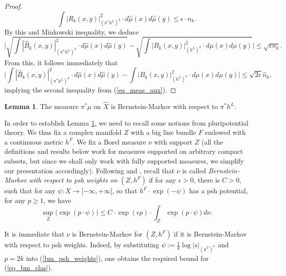\documentclass[12pt]{article}
\numberwithin{equation}{section}
\theoremstyle{theorem}
\theoremstyle{definition}
\newtheorem{lem}[thm]{Lemma}
\theoremstyle{remark}
\begin{document}
\begin{proof}
\begin{equation}
			\int |R_k(x, y)|^2_{(\pi^* h^L)^k} \cdot d \hat{\mu}(x) d \hat{\mu}(y)
			\leq
			\epsilon \cdot n_k.
		\end{equation}
		By this and Minkowski inequality, we deduce 
		\begin{equation}
			\bigg|
			\sqrt{ \int |\hat{B}_k(x, y)|^2_{(\pi^* h^L)^k} \cdot d \hat{\mu}(x) d \hat{\mu}(y)} 
			- 
			\sqrt{ \int |B_k(x, y)|^2_{(h^L)^k} \cdot d \mu(x) d \mu(y)}
			\bigg|
			\leq
			\sqrt{\epsilon n_k}.
		\end{equation}
		From this, it follows immediately that
		\begin{equation}
			\Big|
			\int |\hat{B}_k(x, y)|^2_{(\pi^* h^L)^k} \cdot d \hat{\mu}(x) d \hat{\mu}(y)
			- 
			\int |B_k(x, y)|^2_{(h^L)^k} \cdot d \mu(x) d \mu(y)
			\Big|
			\leq
			\sqrt{2 \epsilon} \hat{n}_k,
		\end{equation}
		implying the second inequality from (\ref{eq_meas_aux}).
	\end{proof}
	\begin{lem}\label{lem_bm}
		The measure $\pi^* \mu$ on $\hat{X}$ is Bernstein-Markov with respect to $\pi^* h^L$.
	\end{lem}
	In order to establish Lemma \ref{lem_bm}, we need to recall some notions from pluripotential theory.
	We thus fix a complex manifold $Z$ with a big line bundle $F$ endowed with a continuous metric $h^F$.
	We fix a Borel measure $\nu$ with support $Z$ (all the definitions and results below work for measures supported on arbitrary compact subsets, but since we shall only work with fully supported measures, we simplify our presentation accordingly).
	Following \cite{SiciakDetermMeas} and \cite{BerBoucNys}, recall that $\nu$ is called \textit{Bernstein-Markov with respect to psh weights on $(Z, h^F)$} if for any $\epsilon > 0$, there is $C > 0$, such that for any $\psi: X \to [- \infty, +\infty[$, so that $h^F \cdot \exp(- \psi)$ has a psh potential, for any $p \geq 1$, we have
	\begin{equation}\label{bm_psh_weights}
		\sup_Z \big( \exp(p \cdot \psi) \big)
		\leq
		C
		\cdot
		\exp(\epsilon p)
		\cdot
		\int_Z \exp(p \cdot \psi) d \nu.
	\end{equation}
	\par 
	It is immediate that $\nu$ is Bernstein-Markov for $(Z, h^F)$ if it is Bernstein-Markov with respect to psh weights.
	Indeed, by substituting $\psi := \frac{1}{k} \log |s|_{(h^F)^k}$ and $p = 2k$ into (\ref{bm_psh_weights}), one obtains the required bound for (\ref{eq_bm_clas}).
	\par 
\end{document}
